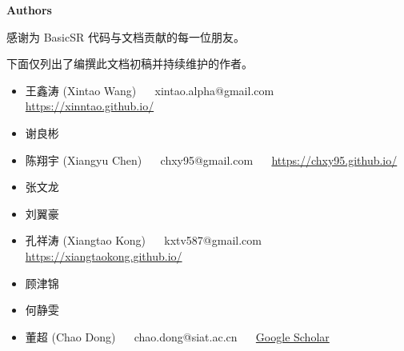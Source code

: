 \documentclass[../main.tex]{subfiles}
\begin{document}
\newpage

{\Large\textbf{Authors}}

感谢为 BasicSR 代码与文档贡献的每一位朋友。

下面仅列出了编撰此文档初稿并持续维护的作者。

\begin{itemize}
    \item 王鑫涛 (Xintao Wang) ~~ xintao.alpha@gmail.com ~~ \url{https://xinntao.github.io/}
    \item 谢良彬
    \item 陈翔宇 (Xiangyu Chen) ~~ chxy95@gmail.com ~~ \url{https://chxy95.github.io/}
    \item 张文龙
    \item 刘翼豪
    \item 孔祥涛 (Xiangtao Kong) ~~ kxtv587@gmail.com ~~ \url{https://xiangtaokong.github.io/}
    \item 顾津锦
    \item 何静雯
    \item 董超 (Chao Dong) ~~ chao.dong@siat.ac.cn ~~ \href{https://scholar.google.com.hk/citations?user=OSDCB0UAAAAJ}{Google Scholar}
\end{itemize}
\end{document}
